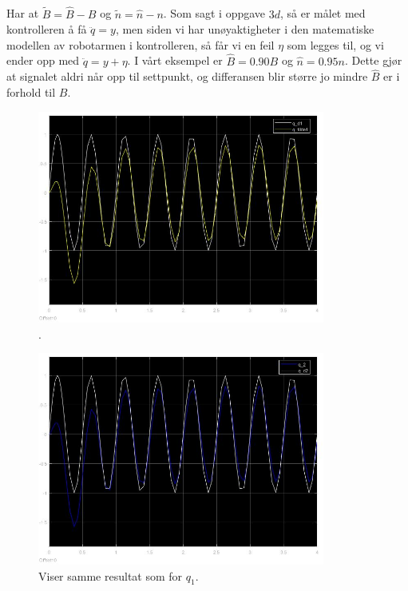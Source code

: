 \documentclass[norsk]{article}
\begin{document}
\subsection{ }
Har at \(\tilde{B} = \hat{B} - B\) og \(\tilde{n} = \hat{n} - n\). Som sagt i oppgave \(3d\), så er målet med kontrolleren å få \(\ddot{q} = y\), men siden vi har unøyaktigheter i den matematiske modellen av robotarmen i kontrolleren, så får vi en feil \(\eta\) som legges til, og vi ender opp med \(\ddot{q} = y + \eta\). I vårt eksempel er \(\hat{B} = 0.90B\) og \(\hat{n} = 0.95n\). Dette gjør at signalet aldri når opp til settpunkt, og differansen blir større jo mindre \(\hat{B}\) er i forhold til \(B\).
\begin{figure}[H]
\includegraphics[height=7cm]{illustrations/oppg3h_illu1}
\caption{.}
\end{figure}

\begin{figure}[H]
\includegraphics[height=7cm]{illustrations/oppg3h_illu2}
\caption{Viser samme resultat som for \(q_1\).}
\end{figure}
\end{document}
